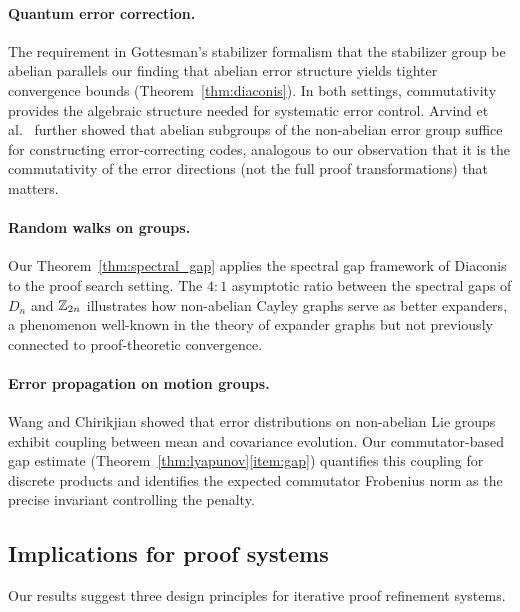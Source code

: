 \paragraph{Quantum error correction.}
The requirement in Gottesman's stabilizer formalism \cite{gottesman1996}
that the stabilizer group be abelian parallels our finding that abelian
error structure yields tighter convergence bounds
(Theorem~\ref{thm:diaconis}).  In both settings, commutativity provides
the algebraic structure needed for systematic error control.
Arvind et al.\ \cite{arvind2002} further showed that abelian subgroups
of the non-abelian error group suffice for constructing error-correcting
codes, analogous to our observation that it is the commutativity of the
error directions (not the full proof transformations) that matters.

\paragraph{Random walks on groups.}
Our Theorem~\ref{thm:spectral_gap} applies the spectral gap framework
of Diaconis \cite{diaconis1988} to the proof search setting.  The
$4{:}1$ asymptotic ratio between the spectral gaps of $D_n$ and
$\mathbb{Z}_{2n}$ illustrates how non-abelian Cayley graphs serve as better
expanders, a phenomenon well-known in the theory of expander graphs
but not previously connected to proof-theoretic convergence.

\paragraph{Error propagation on motion groups.}
Wang and Chirikjian \cite{wang2008} showed that error distributions
on non-abelian Lie groups exhibit coupling between mean and covariance
evolution.  Our commutator-based gap estimate
(Theorem~\ref{thm:lyapunov}\ref{item:gap}) quantifies this coupling
for discrete products and identifies the expected commutator Frobenius
norm as the precise invariant controlling the penalty.

\subsection{Implications for proof systems}

Our results suggest three design principles for iterative proof
refinement systems.

